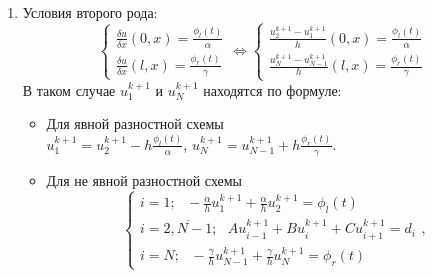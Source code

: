 \documentclass[12pt]{article}
\begin{document}
\begin{enumerate}
        \item Условия второго рода:
            \begin{equation*}
                \begin{cases}
                    \frac{\delta u}{\delta x}(0,x) = \frac{\phi_l(t)}{\alpha}
                    \\
                    \frac{\delta u}{\delta x}(l,x) = \frac{\phi_r(t)}{\gamma}
                \end{cases}
                \Leftrightarrow
                \begin{cases}
                    \frac{u_{2}^{k+1}-u_{1}^{k+1}}{h}(0,x) = \frac{\phi_l(t)}{\alpha}
                    \\
                    \frac{u_{N}^{k+1}-u_{N-1}^{k+1}}{h}(l,x) = \frac{\phi_r(t)}{\gamma}
                \end{cases}
            \end{equation*}
            В таком случае $u_1^{k+1}$ и $u_N^{k+1}$ находятся по формуле:
            \begin{itemize}
                \item Для явной разностной схемы\\
                $u_1^{k+1}=u_2^{k+1}-h\frac{\phi_l(t)}{\alpha}$, $u_N^{k+1}=u_{N-1}^{k+1}+h\frac{\phi_r(t)}{\gamma}$.
                \item Для не явной разностной схемы\\
                \begin{equation*}
                    \begin{cases}
                        i=1;\:\:\: -\frac{\alpha}{h}u_1^{k+1} +\frac{\alpha}{h}u_{2}^{k+1}=\phi_l(t)
                        \\
                        i=\overline{2,N-1};\:\:\:Au_{i-1}^{k+1} + Bu_i^{k+1} +Cu_{i+1}^{k+1}=d_i
                        \\
                        i=N;\:\:\: -\frac{\gamma}{h}u_{N-1}^{k+1} +\frac{\gamma}{h}u_{N}^{k+1}=\phi_r(t)
                    \end{cases},
                \end{equation*}
            \end{itemize}
        

\end{enumerate}
\end{document}
